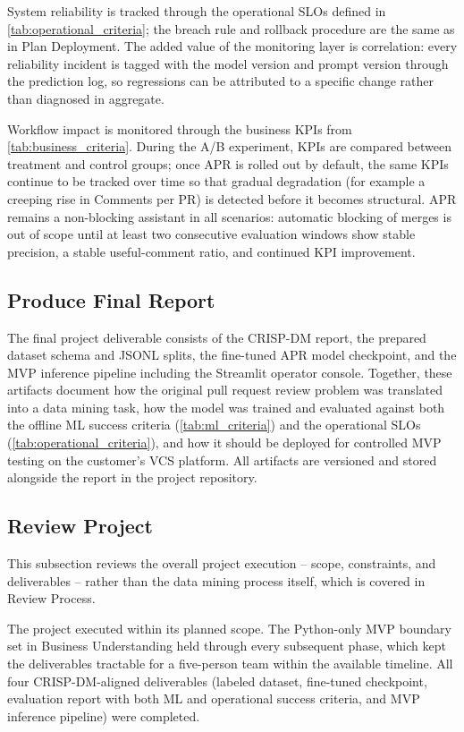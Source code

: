 \documentclass[11pt]{article}
\begin{document}
System reliability is tracked through the operational SLOs defined in \cref{tab:operational_criteria}; the breach rule and rollback procedure are the same as in Plan Deployment. The added value of the monitoring layer is correlation: every reliability incident is tagged with the model version and prompt version through the prediction log, so regressions can be attributed to a specific change rather than diagnosed in aggregate.

Workflow impact is monitored through the business KPIs from \cref{tab:business_criteria}. During the A/B experiment, KPIs are compared between treatment and control groups; once APR is rolled out by default, the same KPIs continue to be tracked over time so that gradual degradation (for example a creeping rise in Comments per PR) is detected before it becomes structural. APR remains a non-blocking assistant in all scenarios: automatic blocking of merges is out of scope until at least two consecutive evaluation windows show stable precision, a stable useful-comment ratio, and continued KPI improvement.

\subsection*{Produce Final Report}

The final project deliverable consists of the CRISP-DM report, the prepared dataset schema and JSONL splits, the fine-tuned APR model checkpoint, and the MVP inference pipeline including the Streamlit operator console. Together, these artifacts document how the original pull request review problem was translated into a data mining task, how the model was trained and evaluated against both the offline ML success criteria (\cref{tab:ml_criteria}) and the operational SLOs (\cref{tab:operational_criteria}), and how it should be deployed for controlled MVP testing on the customer's VCS platform. All artifacts are versioned and stored alongside the report in the project repository.

\subsection*{Review Project}

This subsection reviews the overall project execution -- scope, constraints, and deliverables -- rather than the data mining process itself, which is covered in Review Process.

The project executed within its planned scope. The Python-only MVP boundary set in Business Understanding held through every subsequent phase, which kept the deliverables tractable for a five-person team within the available timeline. All four CRISP-DM-aligned deliverables (labeled dataset, fine-tuned checkpoint, evaluation report with both ML and operational success criteria, and MVP inference pipeline) were completed.
\end{document}
